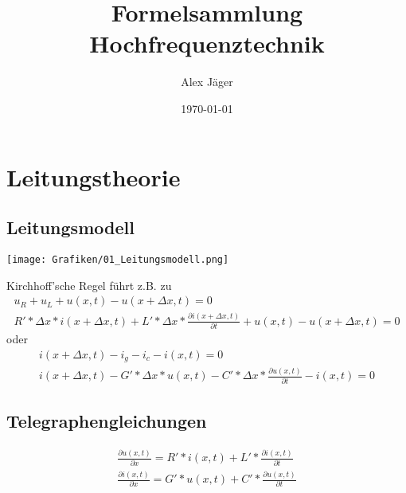 \documentclass[11pt]{scrartcl}
\author{Alex Jäger}
\title{Formelsammlung Hochfrequenztechnik}
\date{\today}
\begin{document}
\maketitle
\newpage
\section{Leitungstheorie}
\subsection{Leitungsmodell}
\begin{center}
	\texttt{[image: Grafiken/01\_Leitungsmodell.png]}
\end{center}
Kirchhoff'sche Regel führt z.B. zu
\begin{gather*}
	u_R+u_L+u(x,t)-u(x+\Delta x,t)=0 \\	
	R'*\Delta x*i(x+\Delta x,t)+L'*\Delta x*\frac{\partial i(x+\Delta x,t)}{\partial t}+u(x,t)-u(x+\Delta x,t)=0
\end{gather*}
oder
\begin{gather*}
	i(x+\Delta x,t)-i_g-i_c-i(x,t)=0 \\
	i(x+\Delta x,t)-G'*\Delta x*u(x,t)-C'*\Delta x*\frac{\partial u(x,t)}{\partial t}-i(x,t)=0
\end{gather*}
\begin{framed}
	\subsection{Telegraphengleichungen}
	\begin{eqnarray}
		\frac{\partial u(x,t)}{\partial x}=R'*i(x,t)+L'*\frac{\partial i(x,t)}{\partial t}\\
		\frac{\partial i(x,t)}{\partial x}=G'*u(x,t)+C'*\frac{\partial u(x,t)}{\partial t}
	\end{eqnarray}
\end{framed}


	

 
\end{document}
